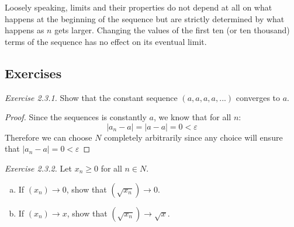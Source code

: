 \documentclass{tufte-book}
\theoremstyle{definition}
\numberwithin{section}{chapter}
\begin{document}
Loosely speaking, limits and their properties do not depend at all on what happens at the beginning of the sequence but are strictly determined by what happens as $n$ gets larger.  Changing the values of the first ten (or ten thousand) terms of the sequence has no effect on its eventual limit.


\medskip


\subsection{Exercises}
\noindent
\emph{Exercise 2.3.1.} Show that the constant sequence $(a,a,a,a,...)$ converges to $a$.
\begin{proof}
Since the sequences is constantly $a$, we know that for all $n$:
	$$ |a_n - a| = |a-a| = 0 < \varepsilon $$
	Therefore we can choose $N$ completely arbitrarily since any choice will ensure that $|a_n -a| = 0 < \varepsilon$
\end{proof}

\smallskip

\noindent
\emph{Exercise 2.3.2.}
Let $x_n \geq 0$ for all $n \in N$. 
\begin{enumerate}[(a)]
\item If $(x_n) \to 0$, show that $(\sqrt{x_n}) \to 0$. 
\item If $(x_n) \to x$, show that $(\sqrt{x_n}) \to \sqrt{x}$.
\end{enumerate}
\end{document}
